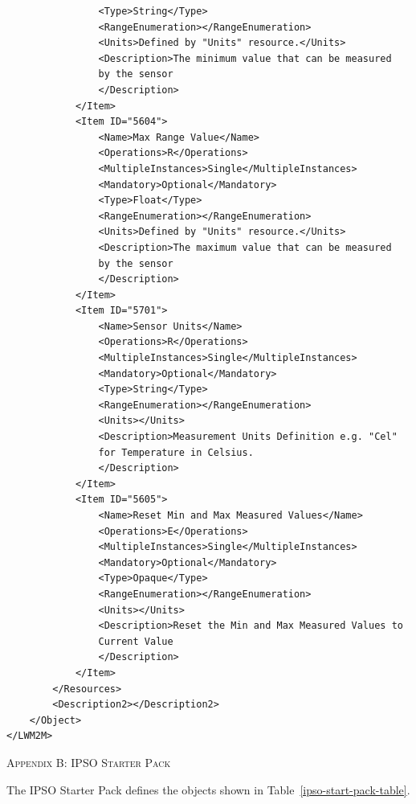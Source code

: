 \documentclass[peerreview, a4paper, 7pt]{IEEEtran}
\begin{document}
\begin{verbatim}
                <Type>String</Type>
                <RangeEnumeration></RangeEnumeration>
                <Units>Defined by "Units" resource.</Units>
                <Description>The minimum value that can be measured 
                by the sensor
                </Description>
            </Item>
            <Item ID="5604">
                <Name>Max Range Value</Name>
                <Operations>R</Operations>
                <MultipleInstances>Single</MultipleInstances>
                <Mandatory>Optional</Mandatory>
                <Type>Float</Type>
                <RangeEnumeration></RangeEnumeration>
                <Units>Defined by "Units" resource.</Units>
                <Description>The maximum value that can be measured 
                by the sensor
                </Description>
            </Item>
            <Item ID="5701">
                <Name>Sensor Units</Name>
                <Operations>R</Operations>
                <MultipleInstances>Single</MultipleInstances>
                <Mandatory>Optional</Mandatory>
                <Type>String</Type>
                <RangeEnumeration></RangeEnumeration>
                <Units></Units>
                <Description>Measurement Units Definition e.g. "Cel"
                for Temperature in Celsius.
                </Description>
            </Item>
            <Item ID="5605">
                <Name>Reset Min and Max Measured Values</Name>
                <Operations>E</Operations>
                <MultipleInstances>Single</MultipleInstances>
                <Mandatory>Optional</Mandatory>
                <Type>Opaque</Type>
                <RangeEnumeration></RangeEnumeration>
                <Units></Units>
                <Description>Reset the Min and Max Measured Values to
                Current Value
                </Description>
            </Item>
        </Resources>
        <Description2></Description2>
    </Object>
</LWM2M>\end{verbatim}

\textsc{Appendix B: IPSO Starter Pack}
\label{appendix_b}

The IPSO Starter Pack defines the objects shown in Table~\ref{ipso-start-pack-table}.
\end{document}

